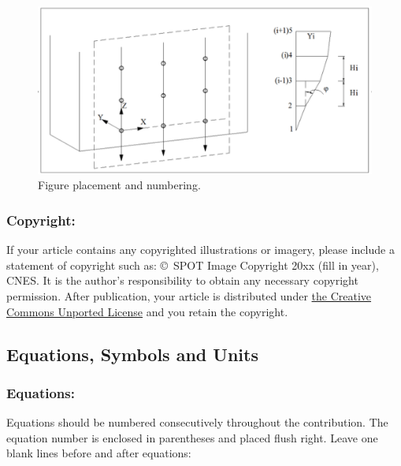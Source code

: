 \documentclass{isprs} %
\begin{document}
\begin{figure}[ht!]
\begin{center}
		\includegraphics[width=1.0\columnwidth]{figures/test_sites/fig1.eps}
	\caption{Figure placement and numbering.}
\label{fig:figure_placement}
\end{center}
\end{figure}


\subsubsection{Copyright:}\label{sec:Copyright}

If your article contains any copyrighted illustrations or imagery, 
please include a statement of copyright such as: \copyright~SPOT Image Copyright 20xx 
(fill in year), CNES\@. It is the author's responsibility to obtain any necessary 
copyright permission. After publication, your article is distributed under \underline{the Creative 
Commons Unported License} and you retain the copyright.


\subsection{Equations, Symbols and Units}\label{sec:Equations, Symbols and Units}

\subsubsection{Equations:}\label{sec:Equations}

Equations should be numbered consecutively throughout the contribution. The equation 
number is enclosed in parentheses and placed flush right. Leave one blank lines 
before and after equations: 
\end{document}

